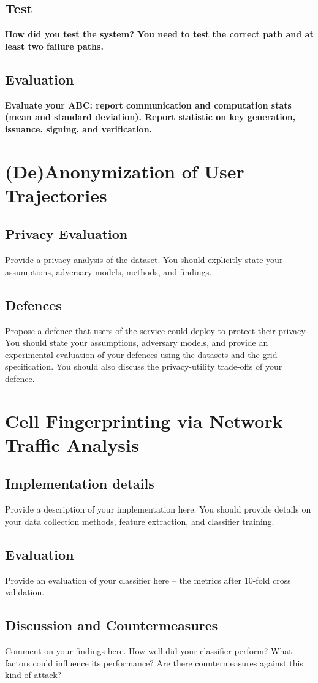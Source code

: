 \documentclass[10pt,conference,compsocconf]{IEEEtran}
\begin{document}
\subsection{Test}
\textbf{How did you test the system?
You need to test the correct path and at least two failure paths.}

\subsection{Evaluation}
\textbf{Evaluate your ABC: report communication and computation stats (mean and standard
deviation). Report statistic on key generation, issuance, signing, and
verification.}

\section{(De)Anonymization of User Trajectories}

\subsection{Privacy Evaluation}
Provide a privacy analysis of the dataset. You should explicitly state your assumptions, adversary
models, methods, and findings.

\subsection{Defences}
Propose a defence that users of the service could deploy to protect their privacy.  You
should state your assumptions, adversary models, and provide an experimental evaluation of your
defences using the datasets and the grid specification. You should also discuss the
privacy-utility trade-offs of your defence.

\section{Cell Fingerprinting via Network Traffic Analysis}

\subsection{Implementation details}
Provide a description of your implementation here. You should provide details on your data collection methods, feature extraction, and classifier training.

\subsection{Evaluation}
Provide an evaluation of your classifier here -- the metrics after 10-fold cross validation.

\subsection{Discussion and Countermeasures}
Comment on your findings here. How well did your classifier perform? What factors could influence its performance? Are there countermeasures against this kind of attack?



\end{document}

